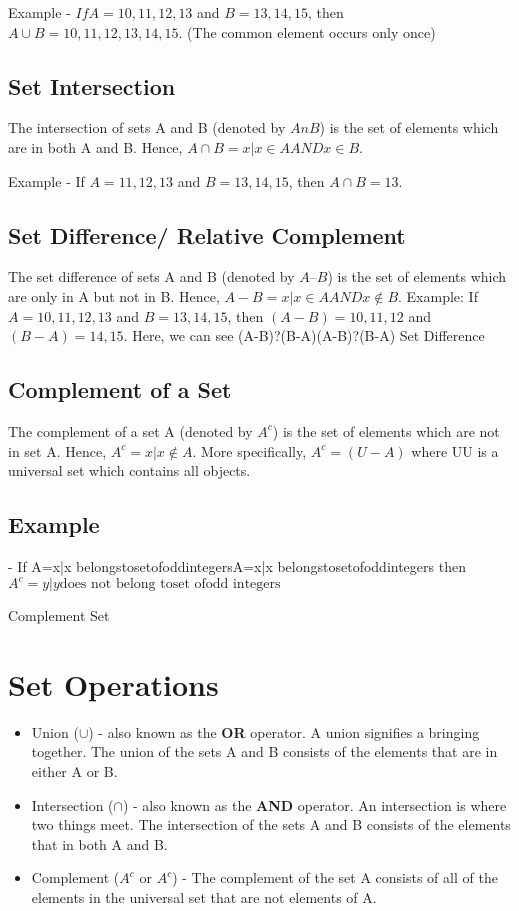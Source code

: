 \documentclass[11pt,a4paper,titlepage,oneside,openany]{article}
\numberwithin{equation}{section}
\numberwithin{algorithm}{section}
\numberwithin{figure}{section}
\numberwithin{table}{section}
\begin{document}
Example - $If A={10,11,12,13}$ and $B = {13,14,15}$, then $A \cup B={10,11,12,13,14,15}$. (The common element occurs only once)

\subsection{Set Intersection}
The intersection of sets A and B (denoted by $AnB$) is the set of elements which are in both A and B. Hence, $A \cap B={x|x \in A AND x \in B}$.

Example - If $A={11,12,13}$ and $B={13,14,15}$, then $A \cap B={13}$.
\subsection{Set Difference/ Relative Complement}
The set difference of sets A and B (denoted by $A–B$) is the set of elements which are only in A but not in B. Hence, $A-B={x|x \in A AND x \notin B}$.
Example: If $A={10,11,12,13}$ and $B={13,14,15}$, then $(A-B)={10,11,12}$ and $(B-A)={14,15}$. Here, we can see (A-B)?(B-A)(A-B)?(B-A) Set Difference
\subsection{Complement of a Set}
The complement of a set A (denoted by $A^{c}$) is the set of elements which are not in set A. Hence, $A^{c}={x|x \notin A}$.
More specifically, $A^{c}=(U-A)$ where UU is a universal set which contains all objects.

\subsection{Example} - If A={x|x belongstosetofoddintegers}A={x|x belongstosetofoddintegers} then $A^{c}={y|y \mbox{does not belong toset ofodd integers}}$

Complement Set
\newpage
\section*{Set Operations}
\begin{itemize}
	\item Union ($\cup$) - also known as the \textbf{OR} operator. A union signifies a bringing together. The union of the sets A and B consists of the elements that are in either A or B.
	\item Intersection ($\cap$) - also known as the \textbf{AND} operator. An intersection is where two things meet. The intersection of the sets A and B consists of the elements that in both A and B.
	\item Complement ($A^{c}$ or $A^{c}$) - The complement of the set A consists of all of the elements in the universal set that are not elements of A.
\end{itemize}
\end{document}
